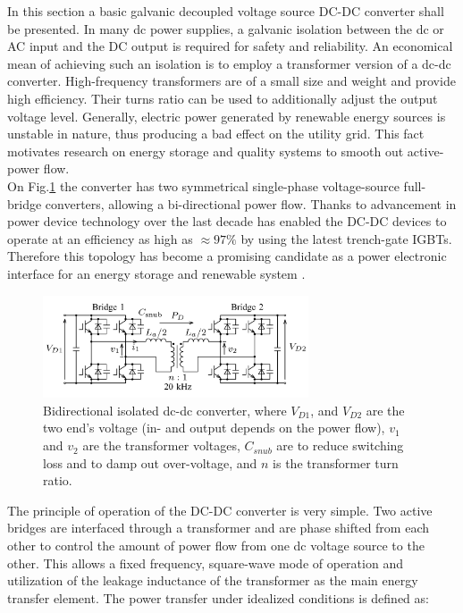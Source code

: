 In this section a basic galvanic decoupled voltage source DC-DC converter shall be presented. In many dc power supplies, a galvanic isolation between the dc or AC input and the DC output is required for safety and reliability. An economical mean of achieving such an isolation is to employ a transformer version of a dc-dc converter. High-frequency transformers are of a small size and weight and provide high efficiency. Their turns ratio can be used to additionally adjust the output voltage level. Generally, electric power generated by renewable energy sources is unstable in nature, thus producing a bad effect on the utility grid. This fact motivates research on energy storage and quality systems to smooth out active-power flow.\\
On Fig.\ref{BASICCSR:fig:DCDCGalvanic} the converter has two symmetrical single-phase voltage-source full-bridge converters, allowing a bi-directional power flow. Thanks to advancement in power device technology over the last decade has enabled the DC-DC devices to operate at an efficiency as high as $\approx97\%$ by using the latest trench-gate IGBTs. Therefore this topology has become a promising candidate as a power electronic interface for an energy storage and renewable system \cite{kheraluwala1992performance} \cite{inoue2007bidirectional}.


\begin{figure}[!ht]
        \centering
        \includegraphics[width=0.7\textwidth]{EMPC_PNG_Pics/DC_DC_galvanic.png}
        \caption{Bidirectional isolated dc-dc converter, where $V_{D1}$, and $V_{D2}$ are the two end's voltage (in- and output depends on the power flow), $v_1$ and $v_2$ are the transformer voltages, $C_{snub}$ are to reduce switching loss and to damp out
over-voltage, and $n$ is the transformer turn ratio.}
        \label{BASICCSR:fig:DCDCGalvanic}
    \end{figure}
		
The principle of operation of the DC-DC converter is very simple. Two active bridges are interfaced through a transformer and are phase shifted from each other to control the amount of power flow from one dc voltage source to the other. This allows a fixed frequency, square-wave mode of operation and utilization of the leakage inductance of the transformer as the main energy transfer element. The power transfer under idealized conditions is defined as:

